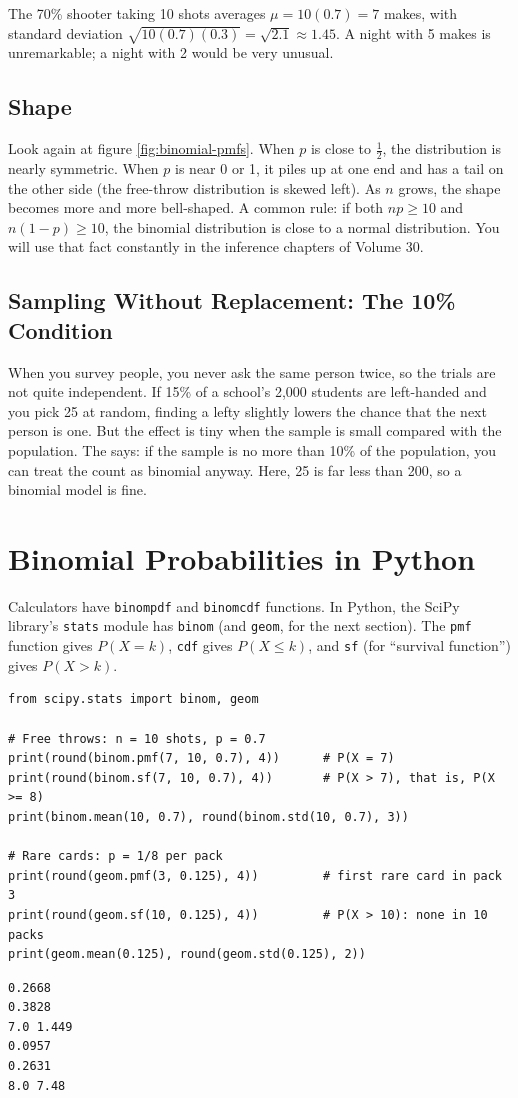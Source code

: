 The 70\% shooter taking 10 shots averages $\mu = 10(0.7) = 7$ makes, with standard
deviation $\sqrt{10(0.7)(0.3)} = \sqrt{2.1} \approx 1.45$. A night with 5 makes is
unremarkable; a night with 2 would be very unusual.

\subsection{Shape}
Look again at figure \ref{fig:binomial-pmfs}. When $p$ is close to $\frac{1}{2}$, the
distribution is nearly symmetric. When $p$ is near 0 or 1, it piles up at one end
and has a tail on the other side (the free-throw distribution is skewed left). As $n$
grows, the shape becomes more and more bell-shaped. A common rule: if both
$np \geq 10$ and $n(1 - p) \geq 10$, the binomial distribution is close to a normal
distribution. You will use that fact constantly in the inference chapters of
Volume 30.

\subsection{Sampling Without Replacement: The 10\% Condition}
When you survey people, you never ask the same person twice, so the trials are not
quite independent. If 15\% of a school's 2,000 students are left-handed and you pick
25 at random, finding a lefty slightly lowers the chance that the next person is one.
But the effect is tiny when the sample is small compared with the population. The
 says: if the sample is no more than 10\% of the population,
you can treat the count as binomial anyway. Here, 25 is far less than 200, so a
binomial model is fine.

\section{Binomial Probabilities in Python}
Calculators have \texttt{binompdf} and \texttt{binomcdf} functions. In Python, the SciPy
library's \texttt{stats} module has \texttt{binom} (and \texttt{geom}, for the next
section). The \texttt{pmf} function gives $P(X = k)$, \texttt{cdf} gives
$P(X \leq k)$, and \texttt{sf} (for ``survival function'') gives $P(X > k)$.

\begin{verbatim}
from scipy.stats import binom, geom

# Free throws: n = 10 shots, p = 0.7
print(round(binom.pmf(7, 10, 0.7), 4))      # P(X = 7)
print(round(binom.sf(7, 10, 0.7), 4))       # P(X > 7), that is, P(X >= 8)
print(binom.mean(10, 0.7), round(binom.std(10, 0.7), 3))

# Rare cards: p = 1/8 per pack
print(round(geom.pmf(3, 0.125), 4))         # first rare card in pack 3
print(round(geom.sf(10, 0.125), 4))         # P(X > 10): none in 10 packs
print(geom.mean(0.125), round(geom.std(0.125), 2))
\end{verbatim}
\begin{verbatim}
0.2668
0.3828
7.0 1.449
0.0957
0.2631
8.0 7.48
\end{verbatim}

